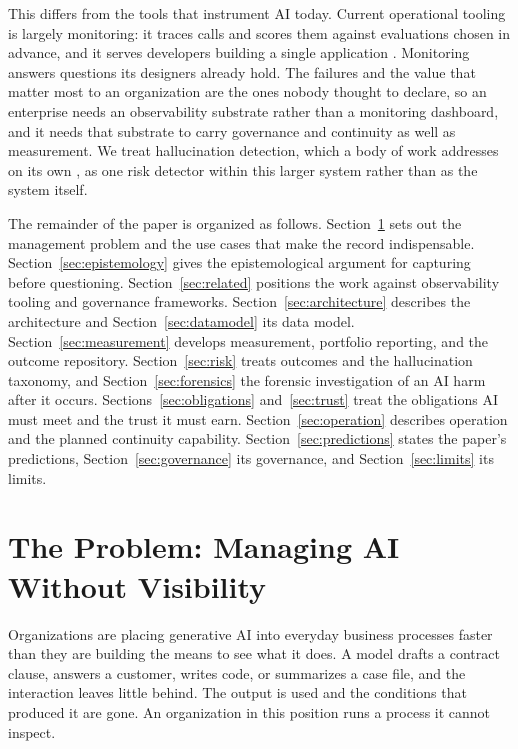 \documentclass[11pt]{article}
\begin{document}
This differs from the tools that instrument AI today. Current operational tooling
is largely monitoring: it traces calls and scores them against evaluations chosen
in advance, and it serves developers building a single application
\cite{majors2022observability}. Monitoring answers questions its designers already
hold. The failures and the value that matter most to an organization are the ones
nobody thought to declare, so an enterprise needs an observability substrate rather
than a monitoring dashboard, and it needs that substrate to carry governance and
continuity as well as measurement. We treat hallucination detection, which a body
of work addresses on its own \cite{ji2023hallucination}, as one risk detector
within this larger system rather than as the system itself.

The remainder of the paper is organized as follows.
Section~\ref{sec:problem} sets out the management problem and the use cases that
make the record indispensable. Section~\ref{sec:epistemology} gives the
epistemological argument for capturing before questioning.
Section~\ref{sec:related} positions the work against observability tooling and
governance frameworks. Section~\ref{sec:architecture} describes the architecture
and Section~\ref{sec:datamodel} its data model. Section~\ref{sec:measurement}
develops measurement, portfolio reporting, and the outcome repository.
Section~\ref{sec:risk} treats outcomes and the hallucination taxonomy, and
Section~\ref{sec:forensics} the forensic investigation of an AI harm after it
occurs. Sections~\ref{sec:obligations} and~\ref{sec:trust} treat the obligations
AI must meet and the trust it must earn. Section~\ref{sec:operation} describes operation
and the planned
continuity capability. Section~\ref{sec:predictions} states the paper's
predictions, Section~\ref{sec:governance} its governance, and
Section~\ref{sec:limits} its limits.

\section{The Problem: Managing AI Without Visibility}
\label{sec:problem}

Organizations are placing generative AI into everyday business processes faster
than they are building the means to see what it does. A model drafts a contract
clause, answers a customer, writes code, or summarizes a case file, and the
interaction leaves little behind. The output is used and the conditions that
produced it are gone. An organization in this position runs a process it cannot
inspect.
\end{document}
